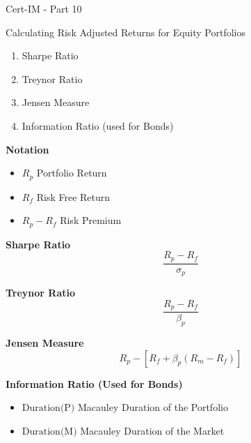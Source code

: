 Cert-IM - Part 10

Calculating Risk Adjusted Returns for Equity Portfolios

\begin{enumerate}
\item Sharpe Ratio
\item Treynor Ratio
\item Jensen Measure
\item Information Ratio (used for Bonds)
\end{enumerate}

\textbf{Notation}
\begin{itemize}
\item $R_p$ Portfolio Return
\item $R_f$ Risk Free Return
\item $R_p - R_f$ Risk Premium
\end{itemize}

\textbf{Sharpe Ratio}
\[ \frac{R_p - R_f}{\sigma_p} \]

\textbf{Treynor Ratio}
\[ \frac{R_p - R_f}{\beta_p} \]

\textbf{Jensen Measure}
\[R_p - \left[ R_f + \beta_p(R_m - R_f) \right] \]


\textbf{Information Ratio (Used for Bonds)}

\begin{itemize}
\item $\mbox{Duration(P)}$ Macauley Duration of the Portfolio
\item $\mbox{Duration(M)}$ Macauley Duration of the Market
\end{itemize}

